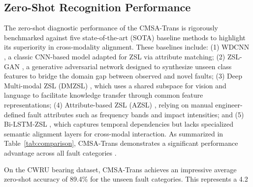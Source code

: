 \subsection{Zero-Shot Recognition Performance}
The zero-shot diagnostic performance of the CMSA-Trans is rigorously benchmarked against five state-of-the-art (SOTA) baseline methods to highlight its superiority in cross-modality alignment. These baselines include: (1) WDCNN \cite{zhang2017new}, a classic CNN-based model adapted for ZSL via attribute matching; (2) ZSL-GAN \cite{xian2019fvaegan}, a generative adversarial network designed to synthesize unseen class features to bridge the domain gap between observed and novel faults; (3) Deep Multi-modal ZSL (DMZSL) \cite{schonfeld2019generalized}, which uses a shared subspace for vision and language to facilitate knowledge transfer through common feature representations; (4) Attribute-based ZSL (AZSL) \cite{lampert2014attribute}, relying on manual engineer-defined fault attributes such as frequency bands and impact intensities; and (5) Bi-LSTM-ZSL \cite{chen2019bearing}, which captures temporal dependencies but lacks specialized semantic alignment layers for cross-modal interaction. As summarized in Table~\ref{tab:comparison}, CMSA-Trans demonstrates a significant performance advantage across all fault categories \cite{li2022zero, lu2017deep}.

On the CWRU bearing dataset, CMSA-Trans achieves an impressive average zero-shot accuracy of 89.4\% for the unseen fault categories. This represents a 4.2%

